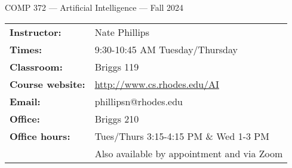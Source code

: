 \documentclass [letterpaper,11pt]{article}
\begin{document}
\begin{center}
\large COMP 372 --- Artificial Intelligence --- Fall 2024
\end{center}

\noindent\begin{tabular}{@{}ll}
\textbf{Instructor:} & Nate Phillips \\
\textbf{Times:} & 9:30-10:45 AM Tuesday/Thursday\\
\textbf{Classroom:} & Briggs 119 \\
\textbf{Course website:} & \url{http://www.cs.rhodes.edu/AI}\\
\textbf{Email:} &phillipsn@rhodes.edu\\
\textbf{Office:} & Briggs 210\\
\textbf{Office hours:} & Tues/Thurs 3:15-4:15 PM \& Wed 1-3 PM \\ &Also available by appointment and via Zoom\\
\end{tabular}
\end{document}

